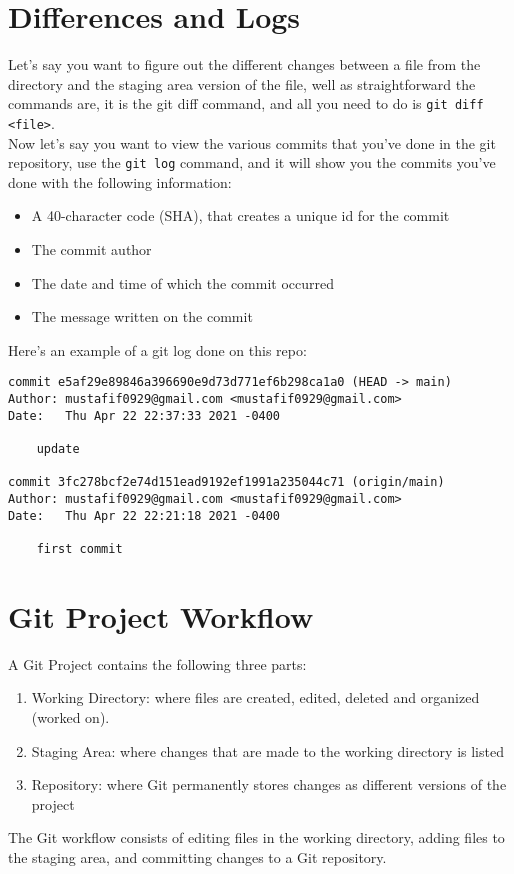\section{Differences and Logs}
Let's say you want to figure out the different changes between a file from the directory and the
staging area version of the file, well as straightforward the commands are, it is the git diff command,
and all you need to do is \verb!git diff <file>!. 
\\
Now let's say you want to view the various commits that you've done in the git repository, use the 
\verb!git log! command, and it will show you the commits you've done with the following information:
\begin{itemize}
    \item A 40-character code (SHA), that creates a unique id for the commit
    \item The commit author
    \item The date and time of which the commit occurred 
    \item The message written on the commit 
\end{itemize}
Here's an example of a git log done on this repo: 
\begin{verbatim}
commit e5af29e89846a396690e9d73d771ef6b298ca1a0 (HEAD -> main)
Author: mustafif0929@gmail.com <mustafif0929@gmail.com>
Date:   Thu Apr 22 22:37:33 2021 -0400

    update

commit 3fc278bcf2e74d151ead9192ef1991a235044c71 (origin/main)
Author: mustafif0929@gmail.com <mustafif0929@gmail.com>
Date:   Thu Apr 22 22:21:18 2021 -0400

    first commit
\end{verbatim}

\section{Git Project Workflow}
A Git Project contains the following three parts: 
\begin{enumerate}
    \item Working Directory: where files are created, edited, deleted and organized (worked on).
    \item Staging Area: where changes that are made to the working directory is listed
    \item Repository: where Git permanently stores changes as different versions of the project
\end{enumerate}
The Git workflow consists of editing files in the working directory, adding files to the staging area, and committing changes to a Git repository. 
\newpage